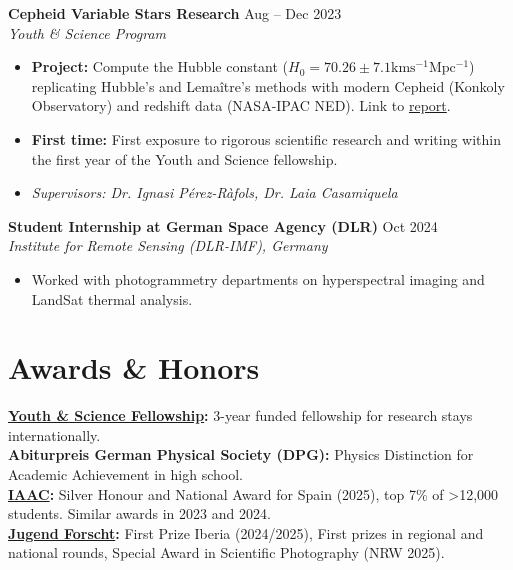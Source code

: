 \documentclass[11pt,a4paper]{article}
\begin{document}
\textbf{Cepheid Variable Stars Research} \hfill Aug -- Dec 2023 \\
\textit{Youth \& Science Program}
\begin{itemize}
	\item \textbf{Project:} Compute the Hubble constant ($H_0 = 70.26 \pm 7.1 \mathrm{kms^{-1}Mpc^{-1}}$) replicating Hubble's and Lemaître's methods with modern Cepheid (Konkoly Observatory) and redshift data (NASA-IPAC NED). Link to \href{https://joanalnu.github.io/files/Paper2023_RecomputingTheHubbleConstant.pdf}{report}.
	\item \textbf{First time:} First exposure to rigorous scientific research and writing within the first year of the Youth and Science fellowship.
	\item \textit{Supervisors: Dr. Ignasi Pérez-Ràfols, Dr. Laia Casamiquela}
\end{itemize}

\textbf{Student Internship at German Space Agency (DLR)} \hfill Oct 2024 \\
\textit{Institute for Remote Sensing (DLR-IMF), Germany}
\begin{itemize}
    \item Worked with photogrammetry departments on hyperspectral imaging and LandSat thermal analysis.
\end{itemize}

\section*{Awards \& Honors}
\textbf{\href{https://www.fundaciocatalunya-lapedrera.com/en/youth-and-science}{Youth \& Science Fellowship}:} 3-year funded fellowship for research stays internationally. \\
\textbf{Abiturpreis German Physical Society (DPG):} Physics Distinction for Academic Achievement in high school. \\
\textbf{\href{https://iaac.space}{IAAC}:} Silver Honour and National Award for Spain (2025), top 7\% of >12,000 students. Similar awards in 2023 and 2024. \\
\textbf{\href{https://www.jugend-forscht.de/information-in-english.html}{Jugend Forscht}:} First Prize Iberia (2024/2025), First prizes in regional and national rounds, Special Award in Scientific Photography (NRW 2025).

\end{document}
